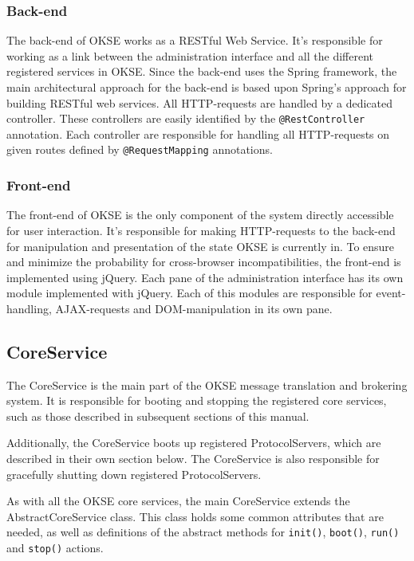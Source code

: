 \subsubsection{Back-end}

The back-end of OKSE works as a RESTful Web Service. It's responsible for working as a link between the administration interface and all the different registered services in OKSE. Since the back-end uses the Spring framework, the main architectural approach for the back-end is based upon Spring’s approach for building RESTful web services. All HTTP-requests are handled by a dedicated controller. These controllers are easily identified by the \verb!@RestController! annotation. Each controller are responsible for handling all HTTP-requests on given routes defined by \verb!@RequestMapping! annotations.  

\subsubsection{Front-end}

The front-end of OKSE is the only component of the system directly accessible for user interaction. It's responsible for making HTTP-requests to the back-end for manipulation and presentation of the state OKSE is currently in. To ensure and minimize the probability for cross-browser incompatibilities, the front-end is implemented using jQuery. Each pane of the administration interface has its own module implemented with jQuery. Each of this modules are responsible for event-handling, AJAX-requests and DOM-manipulation in its own pane.

\subsection{CoreService}

The CoreService is the main part of the OKSE message translation and brokering system. It is responsible for booting and stopping the registered core services, such as those described in subsequent sections of this manual.

Additionally, the CoreService boots up registered ProtocolServers, which are described in their own section below. The CoreService is also responsible for gracefully shutting down registered ProtocolServers.

As with all the OKSE core services, the main CoreService extends the AbstractCoreService class. This class holds some common attributes that are needed, as well as definitions of the abstract methods for \verb!init()!, \verb!boot()!, \verb!run()! and \verb!stop()! actions.

